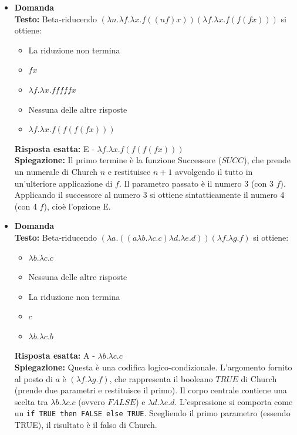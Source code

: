 \documentclass[12pt, a4paper]{article}
\newcounter{domandateoria}
\begin{document}
\begin{itemize}
    \item {}\textbf{Domanda \thedomandateoria} \\
    \textbf{Testo:} Beta-riducendo $(\lambda n.\lambda f.\lambda x.f((n f)x))(\lambda f.\lambda x.f(f(f x)))$ si ottiene:
    \begin{itemize}
        \item[A)] La riduzione non termina
        \item[B)] $f x$
        \item[C)] $\lambda f.\lambda x.f f f f f x$
        \item[D)] Nessuna delle altre risposte
        \item[E)] $\lambda f.\lambda x.f(f(f(f x)))$
    \end{itemize}
    \textbf{Risposta esatta:} E - $\lambda f.\lambda x.f(f(f(f x)))$ \\
    \textbf{Spiegazione:} Il primo termine è la funzione Successore ($SUCC$), che prende un numerale di Church $n$ e restituisce $n + 1$ avvolgendo il tutto in un'ulteriore applicazione di $f$. Il parametro passato è il numero 3 (con 3 $f$). Applicando il successore al numero 3 si ottiene sintatticamente il numero 4 (con 4 $f$), cioè l'opzione E.
    \vspace{0.3cm}

    \item {}\textbf{Domanda \thedomandateoria} \\
    \textbf{Testo:} Beta-riducendo $(\lambda a.((a \lambda b.\lambda c.c)\lambda d.\lambda e.d))(\lambda f.\lambda g.f)$ si ottiene:
    \begin{itemize}
        \item[A)] $\lambda b.\lambda c.c$
        \item[B)] Nessuna delle altre risposte
        \item[C)] La riduzione non termina
        \item[D)] $c$
        \item[E)] $\lambda b.\lambda c.b$
    \end{itemize}
    \textbf{Risposta esatta:} A - $\lambda b.\lambda c.c$ \\
    \textbf{Spiegazione:} Questa è una codifica logico-condizionale. L'argomento fornito al posto di $a$ è $(\lambda f.\lambda g.f)$, che rappresenta il booleano $TRUE$ di Church (prende due parametri e restituisce il primo). Il corpo centrale contiene una scelta tra $\lambda b.\lambda c.c$ (ovvero $FALSE$) e $\lambda d.\lambda e.d$. L'espressione si comporta come un \texttt{if TRUE then FALSE else TRUE}. Scegliendo il primo parametro (essendo TRUE), il risultato è il falso di Church.
    \vspace{0.3cm}


\end{itemize}
\end{document}
